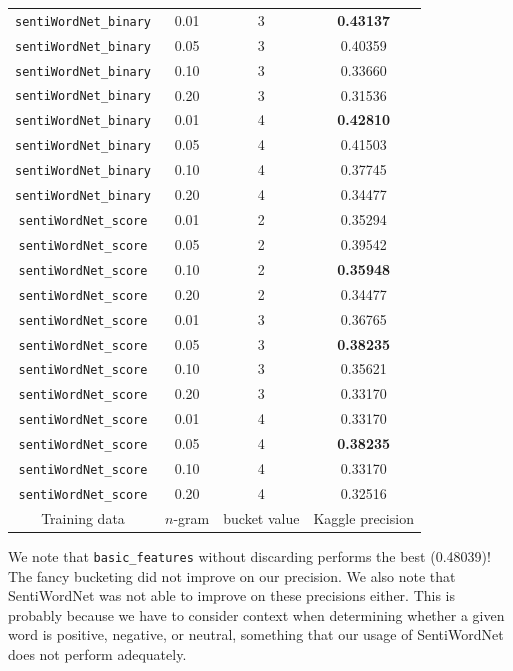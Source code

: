 \documentclass{article}
\begin{document}
{\begin{tabular}{|c|c|c|c|}
\texttt{sentiWordNet\_binary} & 0.01 & 3 & \textbf{0.43137}\\
\texttt{sentiWordNet\_binary} & 0.05 & 3 & 0.40359\\
\texttt{sentiWordNet\_binary} & 0.10 & 3 & 0.33660\\
\texttt{sentiWordNet\_binary} & 0.20 & 3 & 0.31536\\\hline
\texttt{sentiWordNet\_binary} & 0.01 & 4 & \textbf{0.42810}\\
\texttt{sentiWordNet\_binary} & 0.05 & 4 & 0.41503\\
\texttt{sentiWordNet\_binary} & 0.10 & 4 & 0.37745\\
\texttt{sentiWordNet\_binary} & 0.20 & 4 & 0.34477\\\hline\hline
\texttt{sentiWordNet\_score} & 0.01 & 2 & 0.35294\\
\texttt{sentiWordNet\_score} & 0.05 & 2 & 0.39542\\
\texttt{sentiWordNet\_score} & 0.10 & 2 & \textbf{0.35948}\\
\texttt{sentiWordNet\_score} & 0.20 & 2 & 0.34477\\\hline
\texttt{sentiWordNet\_score} & 0.01 & 3 & 0.36765\\
\texttt{sentiWordNet\_score} & 0.05 & 3 & \textbf{0.38235}\\
\texttt{sentiWordNet\_score} & 0.10 & 3 & 0.35621\\
\texttt{sentiWordNet\_score} & 0.20 & 3 & 0.33170\\\hline
\texttt{sentiWordNet\_score} & 0.01 & 4 & 0.33170\\
\texttt{sentiWordNet\_score} & 0.05 & 4 & \textbf{0.38235}\\
\texttt{sentiWordNet\_score} & 0.10 & 4 & 0.33170\\
\texttt{sentiWordNet\_score} & 0.20 & 4 & 0.32516\\\hline
Training data & $n$-gram & bucket value & Kaggle precision\\\hline
\end{tabular}}\par\bigskip

We note that \texttt{basic\_features} without discarding performs the best (0.48039)! The fancy bucketing did not improve on our precision. We also note that SentiWordNet was not able to improve on these precisions either. This is probably because we have to consider context when determining whether a given word is positive, negative, or neutral, something that our usage of SentiWordNet does not perform adequately.\par
\end{document}
